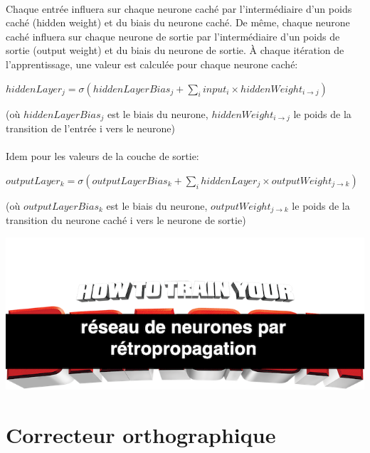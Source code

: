 \documentclass{article}
\begin{document}
\paragraph{} Chaque entrée influera sur chaque neurone caché par l’intermédiaire d’un poids caché (hidden weight) et du biais du neurone caché.
De même, chaque neurone caché influera sur chaque neurone de sortie par l’intermédiaire d’un poids de sortie (output weight) et du biais du neurone de sortie.
À chaque itération de l’apprentissage, une valeur est calculée pour chaque neurone caché:
\newline

$hiddenLayer_j=\sigma(hiddenLayerBias_j+\sum_i input_i\times hiddenWeight_{i\rightarrow j})$

(où $hiddenLayerBias_j$ est le biais du neurone, $hiddenWeight_{i\rightarrow j}$ le poids de la transition de l’entrée i vers le neurone)

\vspace*{0.3cm}

\paragraph{} Idem pour les valeurs de la couche de sortie:\newline

$outputLayer_k=\sigma(outputLayerBias_k+\sum_i hiddenLayer_j\times outputWeight_{j\rightarrow k})$


(où $outputLayerBias_k$ est le biais du neurone, $outputWeight_{j\rightarrow k}$ le poids de la transition du neurone caché i vers le neurone de sortie)

\begin{center}
	\includegraphics[scale=0.5]{Meme}
\end{center}

\newpage
{}
\section{Correcteur orthographique}
\end{document}
